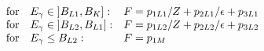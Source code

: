 \documentclass[]{article}
\begin{document}
\[
  \begin{array}{lll}
  \mbox{for\quad} E_{\gamma} \in \left]B_{L1}, B_K\right]: &
         F= p_{1L1}/Z + p_{2L1}/\epsilon + p_{3L1} \\
  \mbox{for\quad} E_{\gamma} \in \left]B_{L2}, B_{L1}\right]: &
         F= p_{1L2}/Z + p_{2L2}/\epsilon + p_{3L2} \\
  \mbox{for\quad} E_{\gamma} \leq B_{L2}: & F= p_{1M}
  \end{array}
\]
\end{document}
